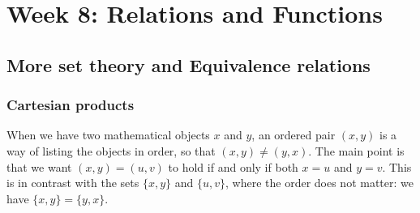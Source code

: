 \documentclass[11pt,dvipsnames]{book}
\numberwithin{equation}{section} %
\numberwithin{figure}{section} %
\numberwithin{table}{section} %
\begin{document}




\pagestyle{empty} %

 \tableofcontents %

\cleardoublepage %

\pagestyle{fancy} %




\part{Week 8: Relations and Functions}







\setcounter{chapter}{12}

\setcounter{page}{0}



\chapter{More set theory and Equivalence relations}

\section{Cartesian products}

When we have two mathematical objects $x$ and $y$, an ordered pair $(x,y)$ is a way of listing the objects in order, so that $(x,y) \neq (y,x)$.
The main point is that we want $(x,y) = (u,v)$ to hold if and only if both $x =u$ and $y = v$.
This is in contrast with the sets $\{x,y\}$ and $\{u,v\}$, where the order does not matter: we have $\{x,y\} = \{y,x\}$.
\end{document}
